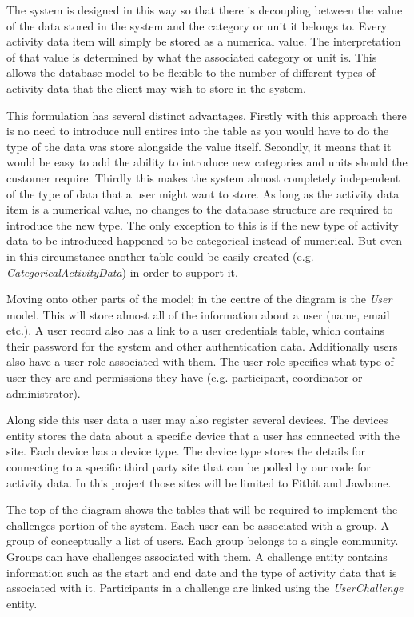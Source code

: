 The system is designed in this way so that there is decoupling between the value of the data stored in the system and the category or unit it belongs to. Every activity data item will simply be stored as a numerical value. The interpretation of that value is determined by what the associated category or unit is. This allows the database model to be flexible to the number of different types of activity data that the client may wish to store in the system. 

This formulation has several distinct advantages. Firstly with this approach there is no need to introduce null entires into the table as you would have to do the type of the data was store alongside the value itself. Secondly, it means that it would be easy to add the ability to introduce new categories and units should the customer require. Thirdly this makes the system almost completely independent of the type of data that a user might want to store. As long as the activity data item is a numerical value, no changes to the database structure are required to introduce the new type. The only exception to this is if the new type of activity data to be introduced happened to be categorical instead of numerical. But even in this circumstance another table could be easily created (e.g. \textit{CategoricalActivityData}) in order to support it.

Moving onto other parts of the model; in the centre of the diagram is the \textit{User} model. This will store almost all of the information about a user (name, email etc.). A user record also has a link to a user credentials table, which contains their password for the system and other authentication data. Additionally users also have a user role associated with them. The user role specifies what type of user they are and permissions they have (e.g. participant, coordinator or administrator).

Along side this user data a user may also register several devices. The devices entity stores the data about a specific device that a user has connected with the site. Each device has a device type. The device type stores the details for connecting to a specific third party site that can be polled by our code for activity data. In this project those sites will be limited to Fitbit and Jawbone.

The top of the diagram shows the tables that will be required to implement the challenges portion of the system. Each user can be associated with a group. A group of conceptually a list of users. Each group belongs to a single community. Groups can have challenges associated with them. A challenge entity contains information such as the start and end date and the type of activity data that is associated with it. Participants in a challenge are linked using the \textit{UserChallenge} entity.

